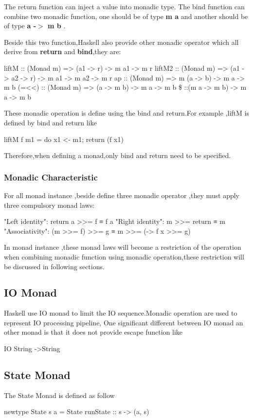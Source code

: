 The return function can inject a value into monadic type.
The bind function can combine two monadic function, one should be of type \textbf{m a} and another should be of type \textbf{a -$>$ m b} .

Beside this two function,Haskell also provide other monadic operator which all derive from \textbf{return} and \textbf{bind},they are:
\begin{hexample}
liftM :: (Monad m) => (a1 -> r) -> m a1 -> m r
liftM2  :: (Monad m) => (a1 -> a2 -> r) -> m a1 -> m a2 -> m r
ap :: (Monad m) => m (a -> b) -> m a -> m b
(=<<) :: (Monad m) => (a -> m b) -> m a -> m b
\$ ::(m a -> m b) -> m a -> m b 
\end{hexample}

These monadic operation is define using the bind and return.For example ,liftM is defined by bind and return like 
\begin{hcode}
liftM f m1              = do { x1 <- m1; return (f x1) }
\end{hcode}
Therefore,when defining a monad,only bind and return need to be specified.

\subsubsection{Monadic Characteristic}
For all monad instance ,beside define three monadic operator ,they must apply three compulsory monad laws:

\begin{hcode}
"Left identity": return a >>= f  ≡  f a
"Right identity": m >>= return  ≡  m
"Associativity": (m >>= f) >>= g  ≡  m >>= (\x -> f x >>= g)
\end{hcode}

In monad instance ,these monad laws will become a restriction of the operation when combining monadic function using monadic operation,these restriction will be discussed in following sections.


\subsection{IO Monad}
Haskell use IO monad to limit the IO sequence.Monadic operation are used to represent IO processing pipeline,
One significant different between IO monad an other monad is that it does not provide escape function like  
\begin{hcode}
IO String ->String
\end{hcode}

\subsection{State Monad}
The State Monad is defined as follow 
\begin{hcode}
newtype State s a = State {runState :: s -> (a, s)}
\end{hcode}



